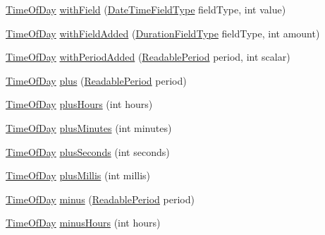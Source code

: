 \begin{DoxyCompactItemize}
\item 
\hyperlink{classorg_1_1joda_1_1time_1_1_time_of_day}{Time\-Of\-Day} \hyperlink{classorg_1_1joda_1_1time_1_1_time_of_day_a16fad875cc264fe4c712b672a9403c24}{with\-Field} (\hyperlink{classorg_1_1joda_1_1time_1_1_date_time_field_type}{Date\-Time\-Field\-Type} field\-Type, int value)
\item 
\hyperlink{classorg_1_1joda_1_1time_1_1_time_of_day}{Time\-Of\-Day} \hyperlink{classorg_1_1joda_1_1time_1_1_time_of_day_a7e9edd10cd28c9c3fc112384ce9e8301}{with\-Field\-Added} (\hyperlink{classorg_1_1joda_1_1time_1_1_duration_field_type}{Duration\-Field\-Type} field\-Type, int amount)
\item 
\hyperlink{classorg_1_1joda_1_1time_1_1_time_of_day}{Time\-Of\-Day} \hyperlink{classorg_1_1joda_1_1time_1_1_time_of_day_aa319f137c3ccd7e02f2c3df7c3fb402f}{with\-Period\-Added} (\hyperlink{interfaceorg_1_1joda_1_1time_1_1_readable_period}{Readable\-Period} period, int scalar)
\item 
\hyperlink{classorg_1_1joda_1_1time_1_1_time_of_day}{Time\-Of\-Day} \hyperlink{classorg_1_1joda_1_1time_1_1_time_of_day_a8830d856d43d09745c5d3e7f07e86bfa}{plus} (\hyperlink{interfaceorg_1_1joda_1_1time_1_1_readable_period}{Readable\-Period} period)
\item 
\hyperlink{classorg_1_1joda_1_1time_1_1_time_of_day}{Time\-Of\-Day} \hyperlink{classorg_1_1joda_1_1time_1_1_time_of_day_a15efc94111699542565e81973e919213}{plus\-Hours} (int hours)
\item 
\hyperlink{classorg_1_1joda_1_1time_1_1_time_of_day}{Time\-Of\-Day} \hyperlink{classorg_1_1joda_1_1time_1_1_time_of_day_a35e653179309d8cabc54f8a55db7a27e}{plus\-Minutes} (int minutes)
\item 
\hyperlink{classorg_1_1joda_1_1time_1_1_time_of_day}{Time\-Of\-Day} \hyperlink{classorg_1_1joda_1_1time_1_1_time_of_day_a99b0e05a1477533ee5237cf5b9060aad}{plus\-Seconds} (int seconds)
\item 
\hyperlink{classorg_1_1joda_1_1time_1_1_time_of_day}{Time\-Of\-Day} \hyperlink{classorg_1_1joda_1_1time_1_1_time_of_day_a842ddff6a19d67e1fa82696b968b1223}{plus\-Millis} (int millis)
\item 
\hyperlink{classorg_1_1joda_1_1time_1_1_time_of_day}{Time\-Of\-Day} \hyperlink{classorg_1_1joda_1_1time_1_1_time_of_day_a5366eaea508f4db33c3a6bb4427e4722}{minus} (\hyperlink{interfaceorg_1_1joda_1_1time_1_1_readable_period}{Readable\-Period} period)
\item 
\hyperlink{classorg_1_1joda_1_1time_1_1_time_of_day}{Time\-Of\-Day} \hyperlink{classorg_1_1joda_1_1time_1_1_time_of_day_ac6b5d800112fad5d3787f8e502200ad3}{minus\-Hours} (int hours)

\end{DoxyCompactItemize}
